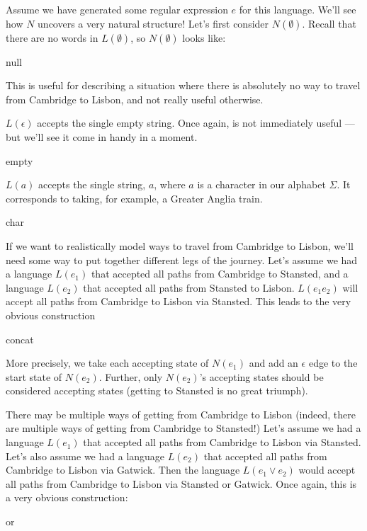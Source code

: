 Assume we have generated some regular expression $e$ for this language. We'll see how $N$ uncovers a very natural structure! Let's first consider $N(\emptyset)$. Recall that there are no words in $L(\emptyset)$, so $N(\emptyset)$ looks like:

\begin{center}
{null}
\end{center}

This is useful for describing a situation where there is absolutely no way to travel from Cambridge to Lisbon, and not really useful otherwise.

$L(\epsilon)$ accepts the single empty string. Once again, is not immediately useful --- but we'll see it come in handy in a moment.

\begin{center}
{empty}
\end{center}

$L(a)$ accepts the single string, $a$, where $a$ is a character in our alphabet $\Sigma$. It corresponds to taking, for example, a Greater Anglia train.

\begin{center}
{char}
\end{center}

If we want to realistically model ways to travel from Cambridge to Lisbon, we'll need some way to put together different legs of the journey. Let's assume we had a language $L(e_1)$ that accepted all paths from Cambridge to Stansted, and a language $L(e_2)$ that accepted all paths from Stansted to Lisbon. $L(e_1 e_2)$ will accept all paths from Cambridge to Lisbon via Stansted. This leads to the very obvious construction

\begin{center}
    {concat}
\end{center}

More precisely, we take each accepting state of $N(e_1)$ and add an $\epsilon$ edge to the start state of $N(e_2)$. Further, only $N(e_2)$'s accepting states should be considered accepting states (getting to Stansted is no great triumph).  

There may be multiple ways of getting from Cambridge to Lisbon (indeed, there are multiple ways of getting from Cambridge to Stansted!) Let's assume we had a language $L(e_1)$ that accepted all paths from Cambridge to Lisbon via Stansted. Let's also assume we had a language $L(e_2)$ that accepted all paths from Cambridge to Lisbon via Gatwick. Then the language $L(e_1 \lor e_2)$ would accept all paths from Cambridge to Lisbon via Stansted or Gatwick. Once again, this is a very obvious construction:
\begin{center}
{or}
\end{center}

